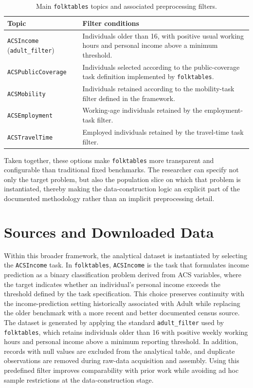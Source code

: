 \begin{table}[htbp]
\centering
\renewcommand{\arraystretch}{1.2}
\caption{Main \texttt{folktables} topics and associated preprocessing filters.}
\label{tab:folktables-filters}
\begin{tabular}{>{\raggedright\arraybackslash}p{} p{}}
  \toprule
  \textbf{Topic} & \textbf{Filter conditions} \\
  \midrule
  \texttt{ACSIncome} (\texttt{adult\_filter}) & Individuals older than 16, with positive usual working hours and personal income above a minimum threshold. \\
  \texttt{ACSPublicCoverage} & Individuals selected according to the public-coverage task definition implemented by \texttt{folktables}. \\
  \texttt{ACSMobility} & Individuals retained according to the mobility-task filter defined in the framework. \\
  \texttt{ACSEmployment} & Working-age individuals retained by the employment-task filter. \\
  \texttt{ACSTravelTime} & Employed individuals retained by the travel-time task filter. \\
  \bottomrule
\end{tabular}
\renewcommand{\arraystretch}{1.0}
\end{table}

Taken together, these options make \texttt{folktables} more transparent and configurable than traditional fixed benchmarks. The researcher can specify not only the target problem, but also the population slice on which that problem is instantiated, thereby making the data-construction logic an explicit part of the documented methodology rather than an implicit preprocessing detail.

\section{Sources and Downloaded Data}
\label{sec:dataset-preparation}

Within this broader framework, the analytical dataset is instantiated by selecting the \texttt{ACSIncome} task. In \texttt{folktables}, \texttt{ACSIncome} is the task that formulates income prediction as a binary classification problem derived from ACS variables, where the target indicates whether an individual's personal income exceeds the threshold defined by the task specification. This choice preserves continuity with the income-prediction setting historically associated with Adult while replacing the older benchmark with a more recent and better documented census source. The dataset is generated by applying the standard \texttt{adult\_filter} used by \texttt{folktables}, which retains individuals older than 16 with positive weekly working hours and personal income above a minimum reporting threshold. In addition, records with null values are excluded from the analytical table, and duplicate observations are removed during raw-data acquisition and assembly. Using this predefined filter improves comparability with prior work while avoiding ad hoc sample restrictions at the data-construction stage.

